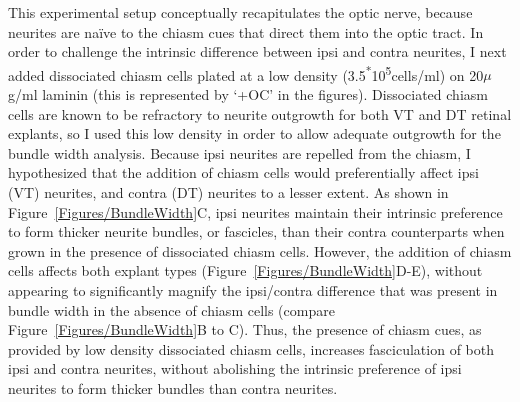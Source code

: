 This experimental setup conceptually recapitulates the optic nerve, because neurites are na\"ive to the chiasm cues that direct them into the optic tract.
In order to challenge the intrinsic difference between ipsi and contra neurites, I next added dissociated chiasm cells plated at a low density (3.5\textsuperscript{*}10\textsuperscript{5}cells/ml) on 20$\mu$g/ml laminin (this is represented by `+OC' in the figures).
Dissociated chiasm cells are known to be refractory to neurite outgrowth for both VT and DT retinal explants, so I used this low density in order to allow adequate outgrowth for the bundle width analysis.
Because ipsi neurites are repelled from the chiasm, I hypothesized that the addition of chiasm cells would preferentially affect ipsi (VT) neurites, and contra (DT) neurites to a lesser extent.
As shown in Figure~\ref{Figures/BundleWidth}C, ipsi neurites maintain their intrinsic preference to form thicker neurite bundles, or fascicles, than their contra counterparts when grown in the presence of dissociated chiasm cells.
However, the addition of chiasm cells affects both explant types (Figure~\ref{Figures/BundleWidth}D-E), without appearing to significantly magnify the ipsi/contra difference that was present in bundle width in the absence of chiasm cells (compare Figure~\ref{Figures/BundleWidth}B to C).
Thus, the presence of chiasm cues, as provided by low density dissociated chiasm cells, increases fasciculation of both ipsi and contra neurites, without abolishing the intrinsic preference of ipsi neurites to form thicker bundles than contra neurites.

